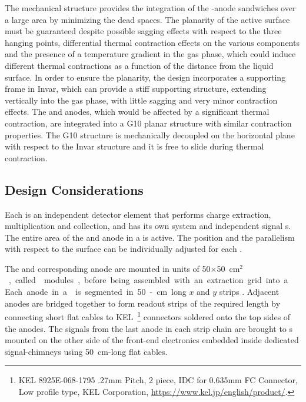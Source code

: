 The  mechanical structure provides the integration of the -anode sandwiches over a large area by minimizing the dead spaces. The planarity of the active surface must be guaranteed despite possible sagging effects with respect to the three hanging points, differential thermal contraction effects on the various  components and the presence of a temperature gradient in the gas phase, which could induce different thermal contractions as a function of the distance from the liquid surface. In order to %
ensure the planarity, the design %
incorporates a supporting frame in Invar, which %
can provide a stiff supporting structure, extending vertically into the gas phase, with little sagging and %
very minor contraction effects. The  and anodes, which would be affected by a significant thermal contraction, are integrated into a G10 planar structure with similar contraction %
properties. The G10 structure is mechanically decoupled on the horizontal plane with respect to the Invar structure  and it is free to slide during thermal contraction. 

\subsection{Design Considerations}
\label{sec:fddp-crp-des-consid}

Each  is an independent detector element that performs charge
extraction, multiplication and collection, and has its own  system and independent signal \fdth{}s. The entire area of the  and anode in a  is active. The position and the parallelism with respect to the \lar surface can be individually adjusted for each .

The  and corresponding anode are mounted in units of \num{50}$\times$\SI{50}{cm$^2$}, called %
 modules, before being assembled with an extraction grid into a . Each anode in a  is segmented in 50-cm long $x$ and $y$ strips . Adjacent  anodes are bridged together to form readout strips of the required length by connecting short flat cables to KEL~\footnote{KEL 8925E-068-1795 .27mm Pitch, 2 piece, IDC for 0.635mm FC Connector, Low profile type, KEL Corporation\texttrademark{}, \url{https://www.kel.jp/english/product/}.} connectors soldered onto the top sides of the anodes. The signals from the last anode in each  strip chain are brought to \fdth{}s mounted on the other side of the front-end electronics embedded inside dedicated signal-\fdth chimneys using \SI{50}{cm}-long flat cables.

